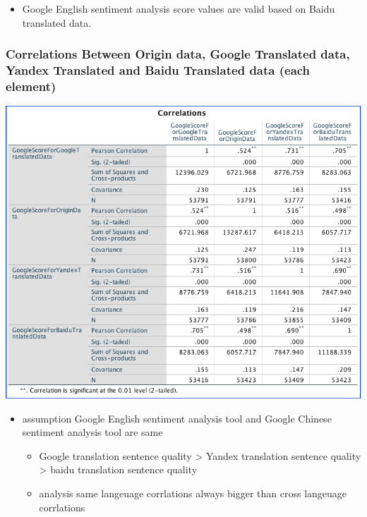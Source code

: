 \begin{itemize}
\item Google English sentiment analysis score values are valid based on Baidu translated data.
\end{itemize}

\subsubsection{Correlations Between Origin data, Google Translated data, Yandex Translated and Baidu Translated data (each element)}
\label{sec:org36da186}
\begin{center}
\includegraphics[width=.9\linewidth]{./img/correlationsBetweenOriginGoogleTranslatedYandexTranslatedBaiduTranslatedUsingGoogleSentiment.png}
\end{center}
\begin{itemize}
\item assumption Google English sentiment analysis tool and Google Chinese sentiment analysis tool are same
\begin{itemize}
\item Google translation sentence quality > Yandex translation sentence quality > baidu translation sentence quality
\item analysis same langeuage corrlations always bigger than cross langeuage corrlations
\end{itemize}
\end{itemize}

